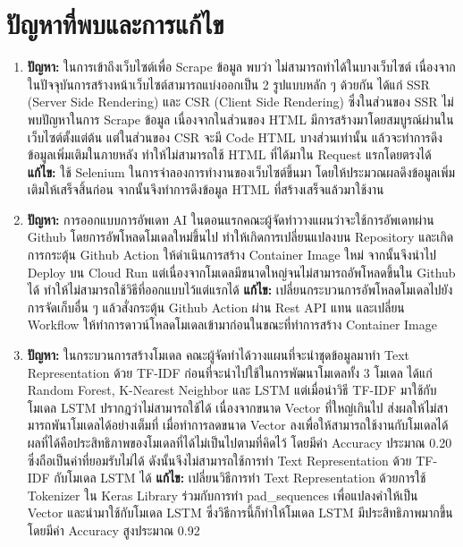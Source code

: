 \documentclass[12pt,oneside,openright,a4paper]{cpe-thai-project}
\begin{document}
\section{ปัญหาที่พบและการแก้ไข}
\begin{enumerate}
  \item  \textbf{ปัญหา: }ในการเข้าถึงเว็บไซต์เพื่อ Scrape ข้อมูล พบว่า ไม่สามารถทำได้ในบางเว็บไซต์ เนื่องจากในปัจจุบันการสร้างหน้าเว็บไซต์สามารถแบ่งออกเป็น 2 รูปแบบหลัก ๆ ด้วยกัน 
  ได้แก่ SSR (Server Side Rendering) และ CSR (Client Side Rendering) ซึ่งในส่วนของ SSR ไม่พบปัญหาในการ Scrape ข้อมูล 
  เนื่องจากในส่วนของ HTML มีการสร้างมาโดยสมบูรณ์ผ่านในเว็บไซต์ตั้งแต่ต้น แต่ในส่วนของ CSR จะมี Code HTML บางส่วนเท่านั้น แล้วจะทำการดึงข้อมูลเพิ่มเติมในภายหลัง 
  ทำให้ไม่สามารถใช้ HTML ที่ได้มาใน Request แรกโดยตรงได้
  \newline\textbf{แก้ไข: }ใช้ Selenium ในการจำลองการทำงานของเว็บไซต์ขึ้นมา โดยให้ประมวณผลดึงข้อมูลเพิ่มเติมให้เสร็จสิ้นก่อน จากนั้นจึงทำการดึงข้อมูล HTML ที่สร้างเสร็จแล้วมาใช้งาน
  \item  \textbf{ปัญหา: }การออกแบบการอัพเดท AI ในตอนแรกคณะผู้จัดทำวางแผนว่าจะใช้การอัพเดทผ่าน Github โดยการอัพโหลดโมเดลใหม่ขึ้นไป ทำให้เกิดการเปลี่ยนแปลงบน Repository 
  และเกิดการกระตุ้น Github Action ให้ดำเนินการสร้าง Container Image ใหม่ จากนั้นจึงนำไป Deploy บน Cloud Run แต่เนื่องจากโมเดลมีขนาดใหญ่จนไม่สามารถอัพโหลดขึ้นใน Github ได้
  ทำให้ไม่สามารถใช้วิธีที่ออกแบบไว้แต่แรกได้ 
  \newline\textbf{แก้ไข: }เปลี่ยนกระบวนการอัพโหลดโมเดลไปยังการจัดเก็บอื่น ๆ แล้วสั่งกระตุ้น Github Action ผ่าน Rest API แทน 
  และเปลี่ยน Workflow ให้ทำการดาวน์โหลดโมเดลเข้ามาก่อนในขณะที่ทำการสร้าง Container Image
  \item  \textbf{ปัญหา: }ในกระบวนการสร้างโมเดล คณะผู้จัดทำได้วางแผนที่จะนำชุดข้อมูลมาทำ Text Representation ด้วย TF-IDF ก่อนที่จะนำไปใช้ในการพัฒนาโมเดลทั้ง 3 โมเดล
  ได้แก่ Random Forest, K-Nearest Neighbor และ LSTM แต่เมื่อนำวิธี TF-IDF มาใช้กับโมเดล LSTM ปรากฎว่าไม่สามารถใช้ได้ เนื่องจากขนาด Vector ที่ใหญ่เกินไป
  ส่งผลให้ไม่สามารถพันาโมเดลได้อย่างเต็มที่ เมื่อทำการลดขนาด Vector ลงเพื่อให้สามารถใช้งานกับโมเดลได้ ผลที่ได้คือประสิทธิภาพของโมเดลที่ได้ไม่เป็นไปตามที่คิดไว้
  โดยมีค่า Accuracy ประมาณ 0.20 ซึ่งถือเป็นค่าที่ยอมรับไม่ได้ ดังนั้นจึงไม่สามารถใช้การทำ Text Representation ด้วย TF-IDF กับโมเดล LSTM ได้
  \newline\textbf{แก้ไข: }เปลี่ยนวิธีการทำ Text Representation ด้วยการใช้ Tokenizer ใน Keras Library ร่วมกับการทำ pad\_sequences 
  เพื่อแปลงคำให้เป็น Vector และนำมาใช้กับโมเดล LSTM ซึ่งวิธีการนี้ก็ทำให้โมเดล LSTM มีประสิทธิภาพมากขึ้น โดยมีค่า Accuracy สูงประมาณ 0.92 
\end{enumerate}
\end{document}
